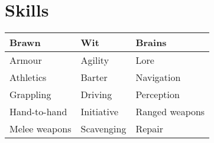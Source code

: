 \documentclass[10pt, a4paper, twocolumn]{article}
\begin{document}
\clearpage
\subtitle{Lists and Tables}
\compacttitle

\section{Skills}
{\small\begin{tabular}{lll}
  Brawn         & Wit        & Brains         \\
  \hline
  Armour        & Agility    & Lore           \\
  Athletics     & Barter     & Navigation     \\
  Grappling     & Driving    & Perception     \\
  Hand-to-hand  & Initiative & Ranged weapons \\
  Melee weapons & Scavenging & Repair
\end{tabular}}
\end{document}
